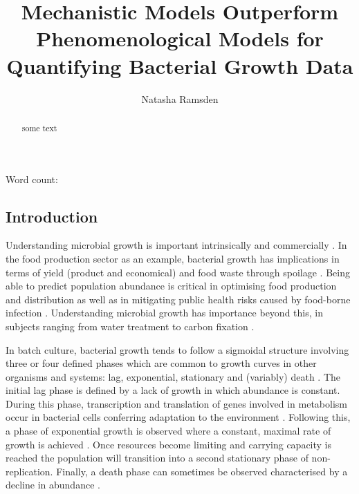 \documentclass[11pt]{article}
\title{Mechanistic Models Outperform Phenomenological Models for Quantifying Bacterial Growth Data}
\author[1]{Natasha Ramsden}
\affil[1]{Imperial College London}
\date{}
\begin{document}
    \begin{titlepage}
    \maketitle
    \thispagestyle{empty}
    
    \begin{center}
        Word count: 
    \end{center}
    
    \end{titlepage}

    \begin{linenumbers}
    
    \begin{abstract}
        some text

    \end{abstract}


    \section{Introduction}
    
        Understanding microbial growth is important intrinsically and commercially \citep{najafpour_chapter_2007}. In the food production sector as an example, bacterial growth has implications in terms of yield (product and economical) and food waste through spoilage \citep{zwietering_modeling_1990}. Being able to predict population abundance is critical in optimising food production and distribution as well as in mitigating public health risks caused by food-borne infection \citep{ross_modeling_2003, mahdinia_microbial_2020}. Understanding microbial growth has importance beyond this, in subjects ranging from water treatment to carbon fixation \citep{esser_modeling_2015}.
        
        In batch culture, bacterial growth tends to follow a sigmoidal structure involving three or four defined phases which are common to growth curves in other organisms and systems: lag, exponential, stationary and (variably) death \citep{najafpour_chapter_2007}. The initial lag phase is defined by a lack of growth in which abundance is constant. During this phase, transcription and translation of genes involved in metabolism occur in bacterial cells conferring adaptation to the environment \citep{buchanan_when_1997}. Following this, a phase of exponential growth is observed where a constant, maximal rate of growth is achieved \citep{najafpour_chapter_2007}. Once resources become limiting and carrying capacity is reached the population will transition into a second stationary phase of non-replication. Finally, a death phase can sometimes be observed characterised by a decline in abundance \citep{zwietering_modeling_1990}.
        

\end{linenumbers}
\end{document}
